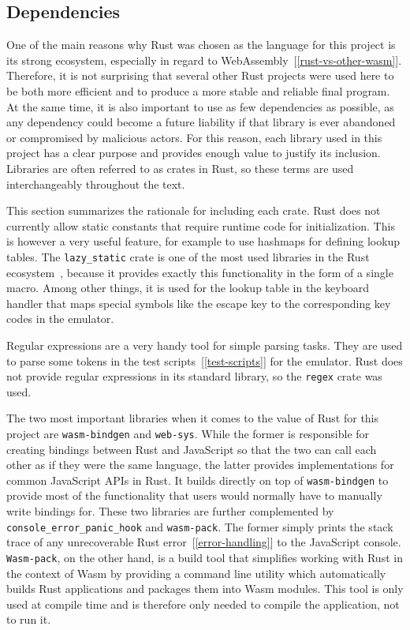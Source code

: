 \subsection{Dependencies}
\label{rust-deps}
One of the main reasons why Rust was chosen as the language for this project is its strong ecosystem, especially in regard to WebAssembly~[\ref{rust-vs-other-wasm}].
Therefore, it is not surprising that several other Rust projects were used here to be both more efficient and to produce a more stable and reliable final program.
At the same time, it is also important to use as few dependencies as possible, as any dependency could become a future liability if that library is ever abandoned or compromised by malicious actors.
For this reason, each library used in this project has a clear purpose and provides enough value to justify its inclusion. Libraries are often referred to as crates in Rust, so these terms are used interchangeably throughout the text.

This section summarizes the rationale for including each crate.
Rust does not currently allow static constants that require runtime code for initialization.
This is however a very useful feature, for example to use hashmaps for defining lookup tables.
The \verb+lazy_static+ crate is one of the most used libraries in the Rust ecosystem~\cite[Downloads all time]{lazystatic}, because it provides exactly this functionality in the form of a single macro.
Among other things, it is used for the lookup table in the keyboard handler that maps special symbols like the escape key to the corresponding key codes in the emulator.

Regular expressions are a very handy tool for simple parsing tasks. They are used to parse some tokens in the test scripts~[\ref{test-scripts}] for the emulator. Rust does not provide regular expressions in its standard library, so the \verb+regex+ crate was used.

\label{web-sys}
The two most important libraries when it comes to the value of Rust for this project are \verb+wasm-bindgen+ and \verb+web-sys+.
While the former is responsible for creating bindings between Rust and JavaScript so that the two can call each other as if they were the same language, the latter provides implementations for common JavaScript APIs in Rust.
It builds directly on top of \verb+wasm-bindgen+ to provide most of the functionality that users would normally have to manually write bindings for.
These two libraries are further complemented by \verb+console_error_panic_hook+ and \verb+wasm-pack+.
The former simply prints the stack trace of any unrecoverable Rust error~[\ref{error-handling}] to the JavaScript console.
\verb+Wasm-pack+, on the other hand, is a build tool that simplifies working with Rust in the context of Wasm by providing a command line utility which automatically builds Rust applications and packages them into Wasm modules.
This tool is only used at compile time and is therefore only needed to compile the application, not to run it.

